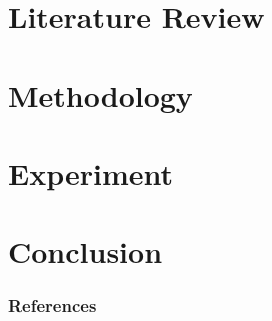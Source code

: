 \documentclass [xcolor=svgnames, t] {beamer}
\theoremstyle{definition}
\theoremstyle{plain}
\theoremstyle{remark}
\begin{document}
\section{Literature Review}

\section{Methodology}

\section{Experiment}

\section{Conclusion}
    

\begin{frame} [allowframebreaks]\frametitle{References}
        
	\nocite{*}
        
\end{frame}
\end{document}
